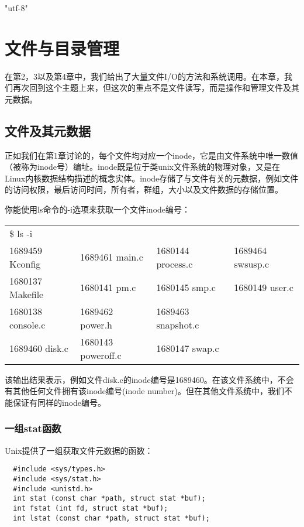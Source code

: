 \ifx\atempxetex\usewhat
\XeTeXinputencoding "utf-8"
\fi
{}

\chapter{文件与目录管理}

在第2，3以及第4章中，我们给出了大量文件I/O的方法和系统调用。在本章，我们再次回到这个主题上来，但这次的重点不是文件读写，而是操作和管理文件及其元数据。

\section{文件及其元数据}

正如我们在第1章讨论的，每个文件均对应一个inode，它是由文件系统中唯一数值（被称为inode号）编址。inode既是位于类unix文件系统的物理对象，又是在Linux内核数据结构描述的概念实体。inode存储了与文件有关的元数据，例如文件的访问权限，最后访问时间，所有者，群组，大小以及文件数据的存储位置。 

你能使用ls命令的-i选项来获取一个文件inode编号：

\begin{tabular}{llll}
\$ ls -i & & &\\
1689459 Kconfig & 1689461 main.c & 1680144 process.c & 1689464 swsusp.c\\
1680137 Makefile & 1680141 pm.c & 1680145 smp.c & 1680149 user.c\\
1680138 console.c & 1689462 power.h & 1689463 snapshot.c & \\
1689460 disk.c & 1680143 poweroff.c & 1680147 swap.c & \\
\end{tabular}

该输出结果表示，例如文件disk.c的inode编号是1689460。在该文件系统中，不会有其他任何文件拥有该inode编号(inode number)。但在其他文件系统中，我们不能保证有同样的inode编号。 

\subsection{一组stat函数}

Unix提供了一组获取文件元数据的函数：

\begin{lstlisting}
  #include <sys/types.h>
  #include <sys/stat.h>
  #include <unistd.h>
  int stat (const char *path, struct stat *buf);
  int fstat (int fd, struct stat *buf);
  int lstat (const char *path, struct stat *buf);
\end{lstlisting}

